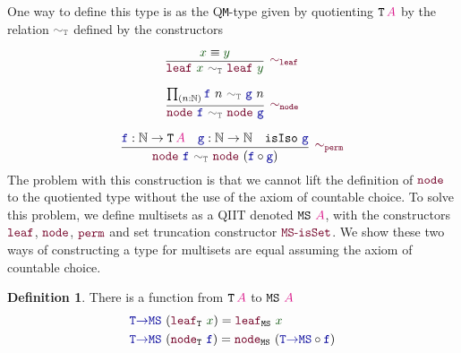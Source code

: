 \documentclass[twoside,11pt,openright]{report}
\theoremstyle{plain} %
\theoremstyle{definition}
\newtheorem{defn}[thm]{Definition}%
\theoremstyle{remark}
\newcommand*{\term}[1]{\textcolor{green!30!black}{#1}} %
\newcommand*{\type}[1]{\textcolor{magenta!90!black}{#1}}
\newcommand*{\relation}[1]{\textcolor{gray!75!black}{\ensuremath{\mathtt{#1}}}}
\newcommand*{\function}[1]{\textcolor{blue!60!black}{\ensuremath{\mathtt{#1}}}}
\newcommand*{\constructor}[1]{\textcolor{purple!60!black}{\ensuremath{\mathtt{#1}}}}
\newcommand*{\typeformer}[1]{\ensuremath{\mathtt{#1}}}
\begin{document}
One way to define this type is as the Q\texttt{M}-type given by quotienting \(\typeformer{T}\,\type{A}\) by the relation \(\relation{\sim_T}\) defined by the constructors\\[-10mm]
\begin{center}
  \strut
  \hfill
  \begin{minipage}{0.35\linewidth}
    \begin{equation}
      \vcenter{\infer[\constructor{\sim_{leaf}}]{\constructor{leaf}~\term{x}~\relation{\sim_{T}}~\constructor{leaf}~\term{y}}{\term{x} \equiv \term{y}}}
    \end{equation}
  \end{minipage}
  \hfill
  \begin{minipage}{0.35\linewidth}
    \begin{equation}
      \vcenter{\infer[\constructor{\sim_{node}}]{\constructor{node}~\function{f}~\relation{\sim_T}~\constructor{node}~\function{g}}{\prod_{(n : \mathbb{N})} \function{f}~n~\relation{\sim_T}~\function{g}~n}}
    \end{equation}
  \end{minipage}
  \hfill
  \strut
\end{center}
\begin{equation}
  \vcenter{\infer[\constructor{\sim_{perm}}]{\constructor{node}~\function{f}~\relation{\sim_T}~\constructor{node}~(\function{f} \circ \function{g})}{\function{f} : \mathbb{N} \rightarrow \typeformer{T}\,\type{A} & \function{g} : \mathbb{N} \rightarrow \mathbb{N} & \mathtt{isIso}~\function{g}}}
\end{equation}
The problem with this construction is that we cannot lift the definition of \(\constructor{node}\) to the quotiented type without the use of the axiom of countable choice. To solve this problem, we define multisets as a QIIT denoted \(\typeformer{MS}~\type{A}\), with the constructors \(\constructor{leaf}\), \(\constructor{node}\), \(\constructor{perm}\) and set truncation constructor \(\constructor{MS\text{-}isSet}\). We show these two ways of constructing a type for multisets are equal assuming the axiom of countable choice.
\begin{defn}
  There is a function from \(\typeformer{T}\,\type{A}\) to \(\typeformer{MS}~\type{A}\)
  \begin{equation}
    \begin{aligned}
      &\function{T{\rightarrow}MS}~(\constructor{leaf}_{\typeformer{T}}~\term{x}) = \constructor{leaf}_{\typeformer{MS}}~\term{x} \\
      &\function{T{\rightarrow}MS}~(\constructor{node}_{\typeformer{T}}~\function{f}) = \constructor{node}_{\typeformer{MS}}~(\function{T{\rightarrow}MS} \circ \function{f})
    \end{aligned}
  \end{equation}
\end{defn}
\end{document}
